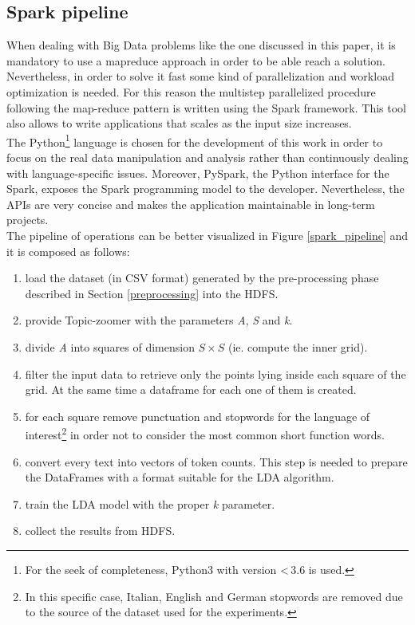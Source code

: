 \documentclass{sig-alternate-05-2015}
\begin{document}
\subsection{Spark pipeline}
When dealing with Big Data problems like the one discussed in this paper, it is mandatory to use a map\-reduce approach in order to be able reach a solution. Nevertheless, in order to solve it fast some kind of parallelization and workload optimization is needed. For this reason the multi\-step parallelized procedure following the map-reduce pattern is written using the Spark framework. This tool also allows to write applications that scales as the input size increases.\\
The Python\footnote{For the seek of completeness, Python3 with version \textless\,3.6 is used.} language is chosen for the development of this work in order to focus on the real data manipulation and analysis rather than continuously dealing with language-specific issues. Moreover, PySpark, the Python interface for the Spark, exposes the Spark programming model to the developer. Nevertheless, the APIs are very concise and makes the application maintainable in long-term projects.\\
The pipeline of operations can be better visualized in Figure \ref{spark_pipeline} and it is composed as follows:
\begin{enumerate}
    \item load the dataset (in CSV format) generated by the pre-processing phase described in Section \ref{preprocessing} into the HDFS.
    \item provide Topic-zoomer with the parameters \emph{A}, \emph{S} and \emph{k}.
    \item divide \emph{A} into squares of dimension $S \times S$ (ie. compute the inner grid).
    \item filter the input data to retrieve only the points lying inside each square of the grid. At the same time a dataframe for each one of them is created.
    \item for each square remove punctuation and stopwords\cite{mmd} for the language of interest\footnote{In this specific case, Italian, English and German stopwords are removed due to the source of the dataset used for the experiments.} in order not to consider the most common short function words.
    \item convert every text into vectors of token counts. This step is needed to prepare the DataFrames with a format suitable for the LDA algorithm.
    \item train the LDA model with the proper \emph{k} parameter.
    \item collect the results from HDFS.
\end{enumerate}
\end{document}
